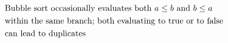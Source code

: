 \documentclass[preview]{standalone}
\begin{document}
\begin{align*}
\special{dvisvgm:raw <g id='unique000'>}\begin{aligned}&\text{Bubble sort occasionally evaluates both } a \le b \text{ and } b \le a\\&\text{within the same branch; both evaluating to true or to false}\\&\text{can lead to duplicates}\end{aligned}\special{dvisvgm:raw </g>}
\end{align*}
\end{document}
